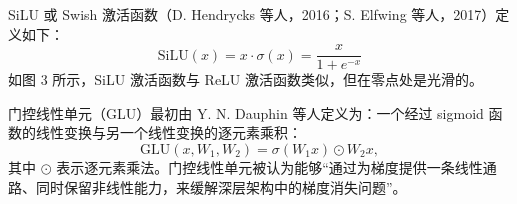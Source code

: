 SiLU 或 Swish 激活函数（D. Hendrycks 等人，2016；S. Elfwing 等人，2017）定义如下：
\begin{equation*}
\mathrm{SiLU}(x) = x \cdot \sigma(x) = \frac{x}{1 + e^{-x}} \tag{5}
\end{equation*}
如图 3 所示，SiLU 激活函数与 ReLU 激活函数类似，但在零点处是光滑的。

门控线性单元（GLU）最初由 Y. N. Dauphin 等人定义为：一个经过 sigmoid 函数的线性变换与另一个线性变换的逐元素乘积：
\begin{equation*}
\mathrm{GLU}(x, W_1, W_2) = \sigma(W_1 x) \odot W_2 x, \tag{6}
\end{equation*}
其中 $\odot$ 表示逐元素乘法。门控线性单元被认为能够“通过为梯度提供一条线性通路、同时保留非线性能力，来缓解深层架构中的梯度消失问题”。
